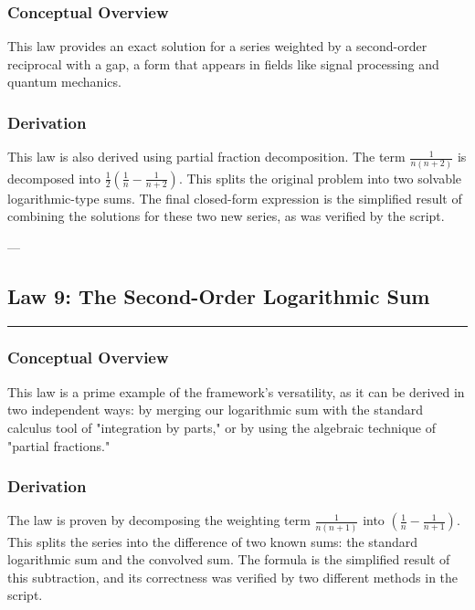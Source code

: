 \subsubsection*{Conceptual Overview}
This law provides an exact solution for a series weighted by a second-order reciprocal with a gap, a form that appears in fields like signal processing and quantum mechanics.

\subsubsection*{Derivation}
This law is also derived using partial fraction decomposition. The term $\frac{1}{n(n+2)}$ is decomposed into $\frac{1}{2}\left(\frac{1}{n} - \frac{1}{n+2}\right)$. This splits the original problem into two solvable logarithmic-type sums. The final closed-form expression is the simplified result of combining the solutions for these two new series, as was verified by the  script.

---
\vspace{1cm}

\subsection*{Law 9: The Second-Order Logarithmic Sum}
\hrule
\vspace{0.3cm}
\vspace{0.5cm}

\subsubsection*{Conceptual Overview}
This law is a prime example of the framework's versatility, as it can be derived in two independent ways: by merging our logarithmic sum with the standard calculus tool of "integration by parts," or by using the algebraic technique of "partial fractions."

\subsubsection*{Derivation}
The law is proven by decomposing the weighting term $\frac{1}{n(n+1)}$ into $(\frac{1}{n} - \frac{1}{n+1})$. This splits the series into the difference of two known sums: the standard logarithmic sum and the convolved sum. The formula is the simplified result of this subtraction, and its correctness was verified by two different methods in the script.


